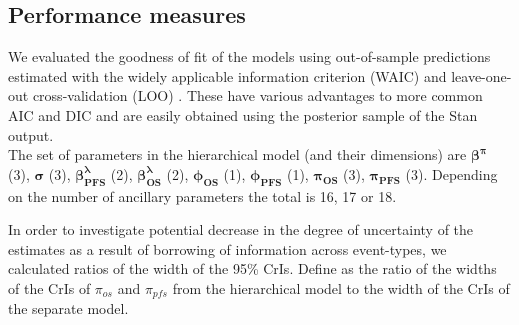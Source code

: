 \documentclass[AMA,STIX1COL]{WileyNJD-v2}
\begin{document}
%
\subsection{Performance measures}
We evaluated the goodness of fit of the models using out-of-sample predictions estimated with the widely applicable information criterion (WAIC) and leave-one-out cross-validation (LOO) \cite{Vehtari2017}.
These have various advantages to more common AIC and DIC and are easily obtained using the posterior sample of the Stan output.\\
The set of parameters in the hierarchical model (and their dimensions) are
$\mathbf{\beta^{\pi}}$ (3), $\mathbf{\sigma}$ (3), $\mathbf{\beta^{\lambda}_{PFS}}$ (2), $\mathbf{\beta^{\lambda}_{OS}}$ (2), $\mathbf{\phi_{OS}}$ (1), $\mathbf{\phi_{PFS}}$ (1), $\mathbf{\pi_{OS}}$ (3), $\mathbf{\pi_{PFS}}$ (3).
Depending on the number of ancillary parameters the total is 16, 17 or 18.


In order to investigate potential decrease in the degree of uncertainty of the estimates as a result of borrowing of information across event-types, we calculated ratios of the width of the 95\% CrIs.
Define as the ratio of the widths of the CrIs of $\pi_{os}$ and $\pi_{pfs}$ from the hierarchical model to the width of the CrIs of the separate model.

%
\end{document}
